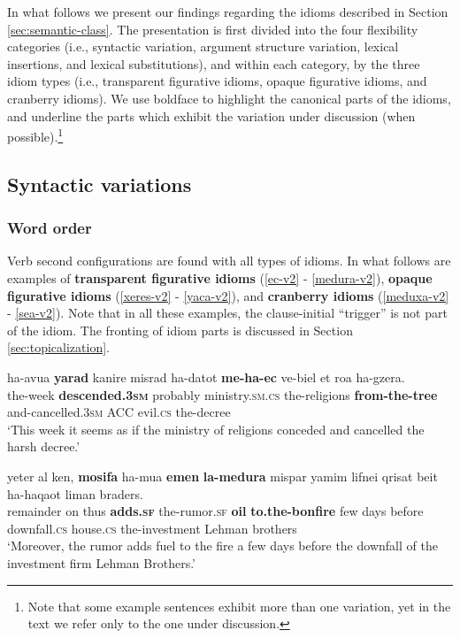 \documentclass[output=paper]{langsci/langscibook}
\begin{document}
In what follows we present our findings regarding the idioms described in Section \ref{sec:semantic-class}. The presentation is first divided into the four flexibility categories (i.e., syntactic variation, argument structure variation, lexical insertions, and lexical substitutions), and within each category, by the three idiom types (i.e., transparent figurative idioms, opaque figurative idioms, and cranberry idioms). We use boldface to highlight the canonical parts of the idioms, and underline the parts which exhibit the variation under discussion (when possible).\footnote{Note that some example sentences exhibit more than one variation, yet in the text we refer only to the one under discussion.}

\subsection{Syntactic variations}
\label{sec:sv}

\subsubsection{Word order}
\label{sec:order}

Verb second configurations are found with all types of idioms. In what follows are examples of \textbf{transparent figurative idioms} (\ref{ec-v2} - \ref{medura-v2}), \textbf{opaque figurative idioms} (\ref{xeres-v2} - \ref{yaca-v2}), and \textbf{cranberry idioms} (\ref{meduxa-v2} - \ref{sea-v2}). Note that in all these examples, the clause-initial ``trigger'' is not part of the idiom. The fronting of idiom parts is discussed in Section \ref{sec:topicalization}.

    \ea\label{ec-v2}
        \gll ha-{\shin}avu{\ayin}a \textbf{yarad} kanir{\alef}e misrad ha-datot \textbf{me-ha-{\ayin}ec} ve-bi{\tet}el {\alef}et ro{\ayin}a ha-gzera.\\
            the-week \textbf{descended.\textsc{3sm}} probably ministry.\textsc{sm}.\textsc{cs} the-religions \textbf{from-the-tree} and-cancelled.\textsc{3sm} ACC evil.\textsc{cs} the-decree \\
        \glt `This week it seems as if the ministry of religions conceded and cancelled the harsh decree.'
    \z

    \ea\label{medura-v2}
        \gll yeter {\ayin}al ken, \textbf{mosifa} ha-{\shin}mu{\ayin}a \textbf{{\shin}emen} \textbf{la-medura} mispar yamim lifnei qrisat beit ha-ha{\shin}qa{\ayin}ot liman braders.\\
            remainder on thus \textbf{adds.\textsc{sf}} the-rumor.\textsc{sf} \textbf{oil} \textbf{to.the-bonfire} few days before downfall.\textsc{cs} house.\textsc{cs} the-investment Lehman brothers\\
        \glt `Moreover, the rumor adds fuel to the fire a few days before the downfall of the investment firm Lehman Brothers.'
    \z
\end{document}

